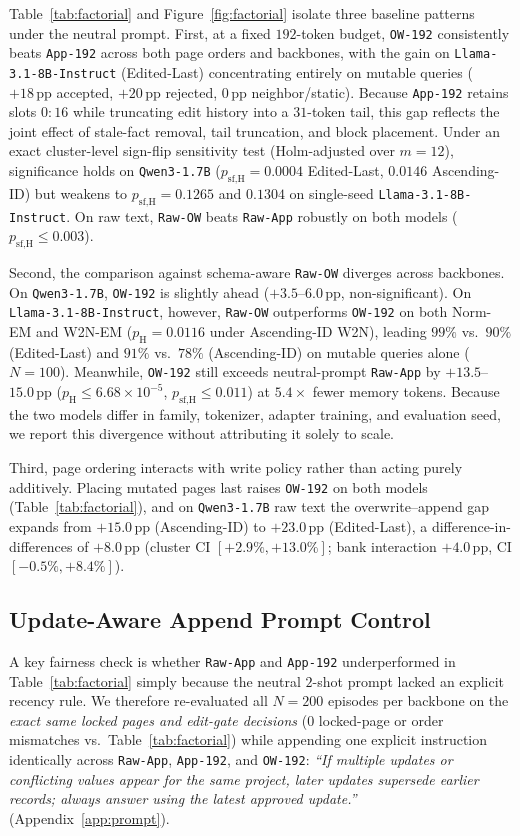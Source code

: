 \documentclass[11pt]{article}
\newcommand{\pp}{\,\text{pp}}
\renewcommand{\_}{\origunderscore\allowbreak}
\begin{document}
Table~\ref{tab:factorial} and Figure~\ref{fig:factorial} isolate three baseline patterns under the neutral prompt. First, at a fixed $192$-token budget, \texttt{OW-192} consistently beats \texttt{App-192} across both page orders and backbones, with the gain on \texttt{Llama-3.1-8B-Instruct} (Edited-Last) concentrating entirely on mutable queries ($+18\pp$ accepted, $+20\pp$ rejected, $0\pp$ neighbor/static). Because \texttt{App-192} retains slots $0{:}16$ while truncating edit history into a $31$-token tail, this gap reflects the joint effect of stale-fact removal, tail truncation, and block placement. Under an exact cluster-level sign-flip sensitivity test (Holm-adjusted over $m=12$), significance holds on \texttt{Qwen3-1.7B} ($p_{\text{sf,H}} = 0.0004$ Edited-Last, $0.0146$ Ascending-ID) but weakens to $p_{\text{sf,H}} = 0.1265$ and $0.1304$ on single-seed \texttt{Llama-3.1-8B-Instruct}. On raw text, \texttt{Raw-OW} beats \texttt{Raw-App} robustly on both models ($p_{\text{sf,H}} \le 0.003$).

Second, the comparison against schema-aware \texttt{Raw-OW} diverges across backbones. On \texttt{Qwen3-1.7B}, \texttt{OW-192} is slightly ahead ($+3.5$--$6.0\pp$, non-significant). On \texttt{Llama-3.1-8B-Instruct}, however, \texttt{Raw-OW} outperforms \texttt{OW-192} on both Norm-EM and W2N-EM ($p_{\text{H}} = 0.0116$ under Ascending-ID W2N), leading $99\%$ vs.\ $90\%$ (Edited-Last) and $91\%$ vs.\ $78\%$ (Ascending-ID) on mutable queries alone ($N=100$). Meanwhile, \texttt{OW-192} still exceeds neutral-prompt \texttt{Raw-App} by $+13.5$--$15.0\pp$ ($p_{\text{H}} \le 6.68\times 10^{-5}$, $p_{\text{sf,H}} \le 0.011$) at $5.4\times$ fewer memory tokens. Because the two models differ in family, tokenizer, adapter training, and evaluation seed, we report this divergence without attributing it solely to scale.

Third, page ordering interacts with write policy rather than acting purely additively. Placing mutated pages last raises \texttt{OW-192} on both models (Table~\ref{tab:factorial}), and on \texttt{Qwen3-1.7B} raw text the overwrite--append gap expands from $+15.0\pp$ (Ascending-ID) to $+23.0\pp$ (Edited-Last), a difference-in-differences of $+8.0\pp$ (cluster CI $[+2.9\%, +13.0\%]$; bank interaction $+4.0\pp$, CI $[-0.5\%, +8.4\%]$).

\subsection{Update-Aware Append Prompt Control}
\label{sec:gate2_ua}
A key fairness check is whether \texttt{Raw-App} and \texttt{App-192} underperformed in Table~\ref{tab:factorial} simply because the neutral $2$-shot prompt lacked an explicit recency rule. We therefore re-evaluated all $N=200$ episodes per backbone on the \emph{exact same locked pages and edit-gate decisions} ($0$ locked-page or order mismatches vs.\ Table~\ref{tab:factorial}) while appending one explicit instruction identically across \texttt{Raw-App}, \texttt{App-192}, and \texttt{OW-192}: \emph{``If multiple updates or conflicting values appear for the same project, later updates supersede earlier records; always answer using the latest approved update.''} (Appendix~\ref{app:prompt}).
\end{document}
